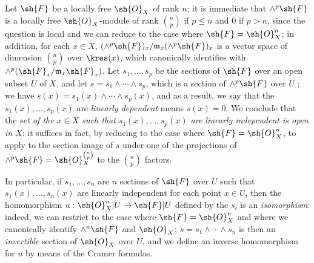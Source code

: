 \begin{env}[5.5.4]
\label{0.5.5.4}
Let $\sh{F}$ be a locally free $\sh{O}_X$ of rank $n$;
it is immediate that $\wedge^p\sh{F}$ is a locally free $\sh{O}_X$-module of rank $\binom{n}{p}$ if $p\leq n$ and $0$ if $p>n$, since the question is local and we can reduce to the case where $\sh{F}=\sh{O}_X^n$;
in addition, for each $x\in X$, $(\wedge^p\sh{F})_x/\mathfrak{m}_x(\wedge^p\sh{F})_x$ is a vector space of dimension $\binom{n}{p}$ over $\kres(x)$, which canonically identifies with $\wedge^p(\sh{F}_x/\mathfrak{m}_x\sh{F}_x)$.
Let $s_1,\dots,s_p$ be the sections of $\sh{F}$ over an open subset $U$ of $X$, and let $s=s_1\wedge\cdots\wedge s_p$, which is a section of $\wedge^p\sh{F}$ over $U$ ;
we have $s(x)=s_1(x)\wedge\cdots\wedge s_p(x)$, and as a result, we say that the $s_1(x),\dots,s_p(x)$ are \emph{linearly dependent} means $s(x)=0$.
We conclude that the \emph{set of the $x\in X$ such that $s_1(x),\dots,s_p(x)$ are linearly independent is open in $X$}: it suffices in fact, by reducing to the case where $\sh{F}=\sh{O}_X^n$, to apply  to the section image of $s$ under one of the projections of $\wedge^p\sh{F}=\sh{O}_X^{\binom{n}{p}}$ to the $\binom{n}{p}$ factors.

In particular, if $s_1,\dots,s_n$ are $n$ sections of $\sh{F}$ over $U$ such that $s_1(x),\dots,s_n(x)$ are linearly independent for each point $x\in U$, then the homomorphism $u:\sh{O}_X^n|U\to\sh{F}|U$ defined by the $s_i$  is an \emph{isomorphism}:
indeed, we can restrict to the case where $\sh{F}=\sh{O}_X^n$ and where we canonically identify $\wedge^n\sh{F}$ and $\sh{O}_X$;
$s=s_1\wedge\cdots\wedge s_n$ is then an \emph{invertible} section of $\sh{O}_X$ over $U$, and we define an inverse homomorphism for $u$ by means of the Cramer formulas.
\end{env}

